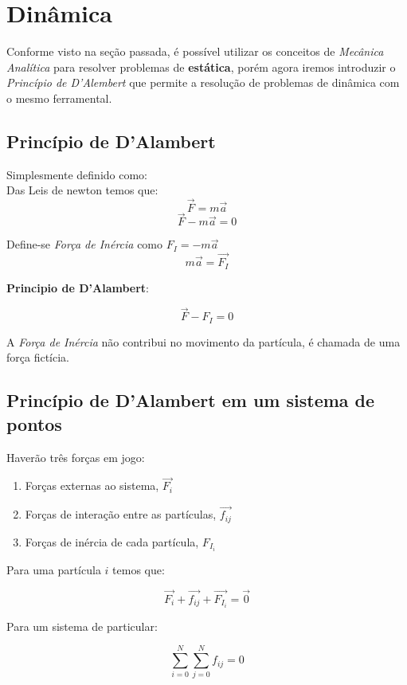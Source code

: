 \section{Dinâmica}

Conforme visto na seção passada, é possível utilizar os conceitos de \textit{Mecânica Analítica} para resolver problemas de \textbf{estática}, porém agora iremos introduzir o \textit{Princípio de D'Alembert} que permite a resolução de problemas de dinâmica com o mesmo ferramental.

\subsection{Princípio de D'Alambert}

Simplesmente definido como:\\

Das Leis de newton temos que:
$$ \vec{F} = m\vec{a}$$
$$ \vec{F} - m\vec{a} = 0$$

Define-se \textit{Força de Inércia} como $F_I = -m\vec{a}$ \\
$$m\vec{a} = \vec{F_I}$$

\textbf{Principio de D'Alambert}:

\begin{equation}
	\boxed{\vec{F} - F_I = 0}
\end{equation}

A \textit{Força de Inércia} não contribui no movimento da partícula, é chamada de uma força fictícia.

\subsection{Princípio de D'Alambert em um sistema de pontos}

Haverão três forças em jogo:

\begin{enumerate}
	\item Forças externas ao sistema, $\vec{F_{i}}$
	\item Forças de interação entre as partículas, $\vec{f_{ij}}$
	\item Forças de inércia de cada partícula, $F_{I_i}$
\end{enumerate}

Para uma partícula $i$ temos que:

$$ \vec{F_i} + \vec{f_{ij}} + \vec{F_{I_i}} = \vec{0} $$

Para um sistema de particular:

$$ \sum_{i=0}^N\sum_{j=0}^N f_{ij} = 0$$

